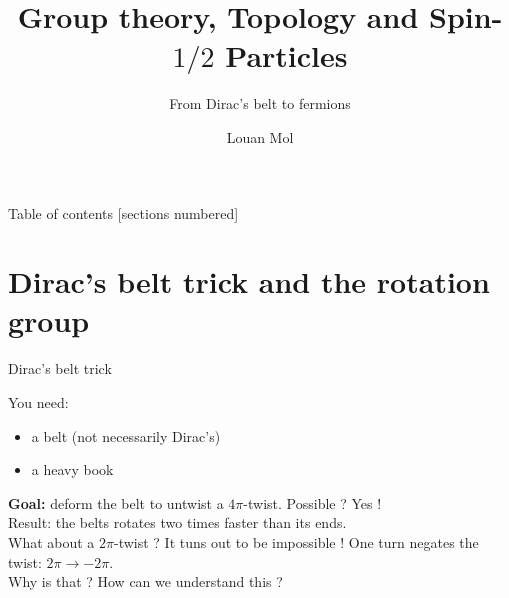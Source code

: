 \documentclass[9pt]{beamer}
\title{Group theory, Topology and Spin-$1/2$ Particles}
\subtitle{From Dirac's belt to fermions}
\date{}
\author{Louan Mol}
\institute{Unversité Libre de Bruxelles\\[2cm]{\small Brussels Summer School of Mathematics 2022}}
\renewcommand{\emph}{\alert}
\begin{document}
\maketitle

\nocite{*}

\begin{frame}{Table of contents}
    [sections numbered]
    \tableofcontents%
\end{frame}

\section{Dirac's belt trick and the rotation group}

\begin{frame}{Dirac's belt trick}
    
    You need:
    \begin{itemize}
        \item a belt (not necessarily Dirac's)
        \item a heavy book
    \end{itemize}

    \textbf{Goal:} deform the belt to untwist a $4\pi$-twist. Possible ? \emph{Yes !}\\[0.2cm]

    Result: the belts rotates two times faster than its ends.\\[0.2cm]
    
    What about a $2\pi$-twist ? It tuns out to be \emph{impossible} ! One turn negates the twist: $2\pi\to-2\pi$.\\[0.2cm]

    \hspace{7cm} Why is that ? How can we understand this ?

\end{frame}
\end{document}
